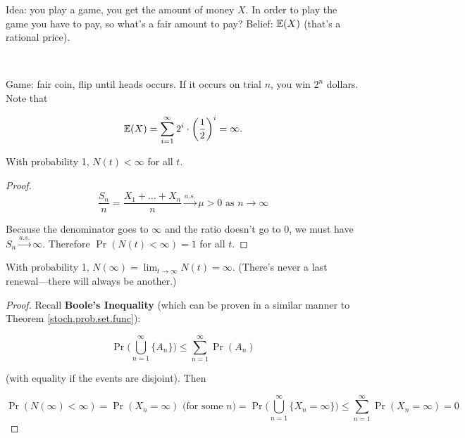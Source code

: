 \begin{example}Idea: you play a game, you get the amount of money \(X\). In order to play the game you have to pay, so what's a fair amount to pay? Belief: \(\E(X)\) (that's a rational price).

\

Game: fair coin, flip until heads occurs. If it occurs on trial \(n\), you win \(2^n\) dollars. Note that

\[
\E(X) = \sum_{i=1}^\infty 2^i \cdot \bigg( \frac{1}{2} \bigg)^ i = \infty.
\]

\end{example}

\begin{proposition}\label{stoch.prop.n.finite} With probability 1, \(N(t) < \infty\) for all \(t\).

\end{proposition}

\begin{proof}

\[
\frac{S_n}{n} = \frac{X_1 + \ldots + X_n}{n} \xrightarrow{a.s.} \mu > 0 \text{ as } n \to \infty
\]

Because the denominator goes to \(\infty\) and the ratio doesn't go to 0, we must have \(S_n \xrightarrow{a.s.} \infty\). Therefore \(\Pr(N(t) < \infty) = 1\) for all \(t\).

\end{proof}

\begin{proposition} With probability 1, \(N(\infty) = \lim_{t \to \infty} N(t) = \infty\). (There's never a last renewal---there will always be another.)

\end{proposition}



\begin{proof}

Recall \textbf{Boole's Inequality} (which can be proven in a similar manner to Theorem \ref{stoch.prob.set.func}):

\[
\Pr\bigg( \bigcup_{n=1}^\infty \{A_n \} \bigg) \leq \sum_{n=1}^\infty \Pr(A_n)
\]

(with equality if the events are disjoint). Then

\[
\Pr(N(\infty) < \infty) = \Pr(X_n = \infty) \text{ (for some } n) = \Pr\bigg( \bigcup_{n=1}^\infty \{X_n = \infty \} \bigg) \leq \sum_{n=1}^\infty \Pr(X_n = \infty) = 0
\]

\end{proof}

